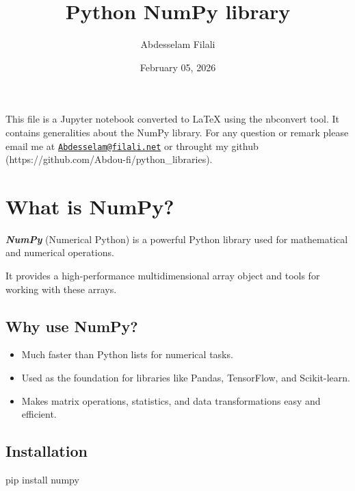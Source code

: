\documentclass[11pt]{article}
\title{Python NumPy library}
\date{February 05, 2026}
\author{Abdesselam Filali}
\providecommand{\tightlist}{%
      \setlength{\itemsep}{0pt}\setlength{\parskip}{0pt}}
\newenvironment{Shaded}{}{}
\newcommand{\NormalTok}[1]{{#1}}
\begin{document}
    
    \maketitle
    
    

    
    This file is a Jupyter notebook converted to LaTeX using the nbconvert
tool. It contains generalities about the NumPy library. For any question
or remark please email me at
\href{mailto:Abdesselam@filali.net}{\nolinkurl{Abdesselam@filali.net}}
or throught my github (https://github.com/Abdou-fi/python\_libraries).

\section{\texorpdfstring{{What is
NumPy?}}{What is NumPy?}}\label{what-is-numpy}

\textbf{\emph{NumPy}} (Numerical Python) is a powerful Python library
used for mathematical and numerical operations.

It provides a high-performance multidimensional array object and tools
for working with these arrays.

\subsection{\texorpdfstring{{Why use
NumPy?}}{Why use NumPy?}}\label{why-use-numpy}

\begin{itemize}
\tightlist
\item
  Much faster than Python lists for numerical tasks.
\item
  Used as the foundation for libraries like Pandas, TensorFlow, and
  Scikit-learn.
\item
  Makes matrix operations, statistics, and data transformations easy and
  efficient.
\end{itemize}

\subsection{\texorpdfstring{{Installation}}{Installation}}\label{installation}

\begin{Shaded}
\begin{Highlighting}[]
\NormalTok{    pip install numpy}
\end{Highlighting}
\end{Shaded}
\end{document}
